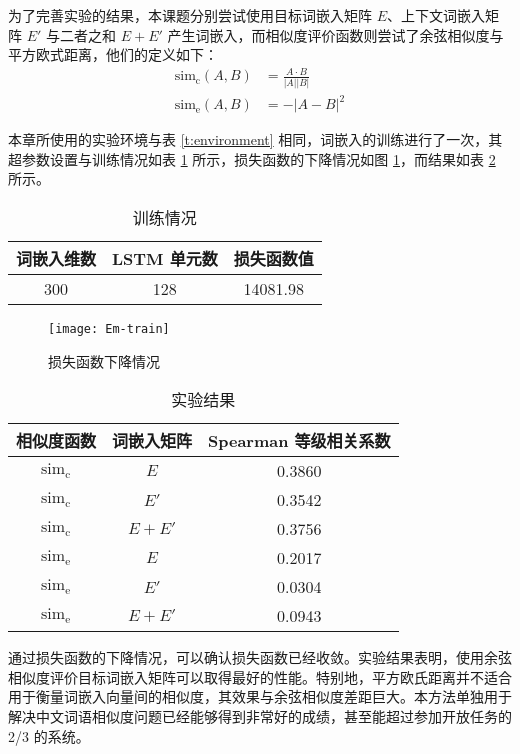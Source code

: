 为了完善实验的结果，本课题分别尝试使用目标词嵌入矩阵 $E$、上下文词嵌入矩阵 $E'$ 与二者之和 $E + E'$ 产生词嵌入，而相似度评价函数则尝试了余弦相似度与平方欧式距离，他们的定义如下：
\begin{align}
\text{sim}_\text{c}(A, B) & = \frac{A \cdot B}{|A| |B|} \\
\text{sim}_\text{e}(A, B) & = -|A - B|^2
\end{align}

本章所使用的实验环境与表 \ref{t:environment} 相同，词嵌入的训练进行了一次，其超参数设置与训练情况如表 \ref{t:embedding train} 所示，损失函数的下降情况如图 \ref{f:embedding loss}，而结果如表 \ref{t:embedding result} 所示。

\begin{table}[h]
	\caption{训练情况}
	\label{t:embedding train}
	\vspace{0.5em}\centering\wuhao
	\begin{tabular}{ccc}
		\toprule[1.5pt]
		词嵌入维数 & LSTM 单元数 & 损失函数值 \\
		\midrule[1pt]
		300 & 128 & 14081.98 \\
		\bottomrule[1.5pt]
	\end{tabular}
\end{table}

\begin{figure}[h]
	\centering
	\texttt{[image: Em-train]}
	\caption{损失函数下降情况}
	\label{f:embedding loss}
	\vspace{-1em}
\end{figure}

\begin{table}[h]
\caption{实验结果}
\label{t:embedding result}
\vspace{0.5em}\centering\wuhao
\begin{tabular}{ccc}
	\toprule[1.5pt]
	相似度函数 & 词嵌入矩阵 & Spearman 等级相关系数 \\
	\midrule[1pt]
	$\text{sim}_\text{c}$ & $E$ & 0.3860 \\
	$\text{sim}_\text{c}$ & $E'$ &  0.3542 \\
	$\text{sim}_\text{c}$ & $E + E'$ & 0.3756 \\
	$\text{sim}_\text{e}$ & $E$ &  0.2017 \\
	$\text{sim}_\text{e}$ & $E'$ & 0.0304 \\
	$\text{sim}_\text{e}$ & $E + E'$ & 0.0943 \\
	\bottomrule[1.5pt]
\end{tabular}
\end{table}

通过损失函数的下降情况，可以确认损失函数已经收敛。实验结果表明，使用余弦相似度评价目标词嵌入矩阵可以取得最好的性能。特别地，平方欧氏距离并不适合用于衡量词嵌入向量间的相似度，其效果与余弦相似度差距巨大。本方法单独用于解决中文词语相似度问题已经能够得到非常好的成绩，甚至能超过参加开放任务的 2/3 的系统。